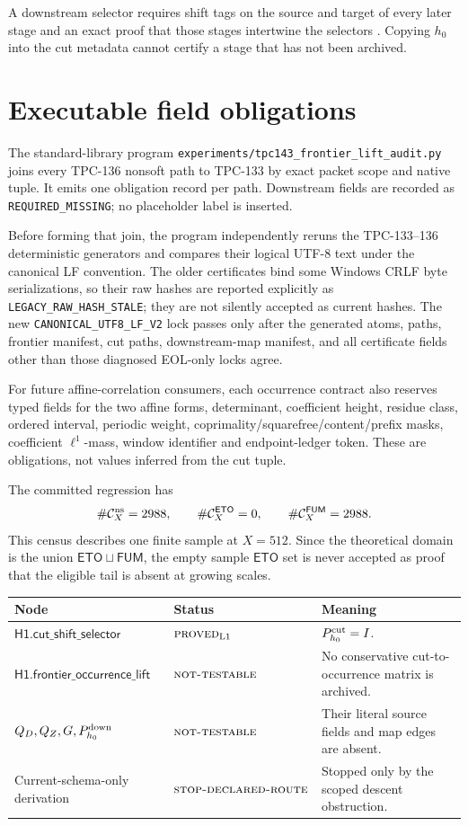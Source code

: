 \documentclass[11pt]{article}
\theoremstyle{definition}
\theoremstyle{remark}
\newcommand{\NT}{\textnormal{\textsc{not-testable}}}
\newcommand{\PROVED}{\textnormal{\textsc{proved}}}
\newcommand{\STOP}{\textnormal{\textsc{stop-declared-route}}}
\newcommand{\Lone}{\mathrm{L1}}
\newcommand{\Ccut}{\mathcal C_X^{\rm ns}}
\begin{document}
A downstream selector requires shift tags on the source and target of
every later stage and an exact proof that those stages intertwine the
selectors \citep{WangTPC123,WangTPC125}.  Copying \(h_0\) into the
cut metadata cannot certify a stage that has not been archived.

\section{Executable field obligations}

The standard-library program
\texttt{experiments/tpc143\_frontier\_lift\_audit.py} joins every
TPC-136 nonsoft path to TPC-133 by exact packet scope and native
tuple.  It emits one obligation record per path.  Downstream fields
are recorded as \texttt{REQUIRED\_MISSING}; no placeholder label is
inserted.

Before forming that join, the program independently reruns the
TPC-133--136 deterministic generators and compares their logical UTF-8
text under the canonical LF convention.  The older certificates bind
some Windows CRLF byte serializations, so their raw hashes are
reported explicitly as \texttt{LEGACY\_RAW\_HASH\_STALE}; they are not
silently accepted as current hashes.  The new
\texttt{CANONICAL\_UTF8\_LF\_V2} lock passes only after the generated
atoms, paths, frontier manifest, cut paths, downstream-map manifest,
and all certificate fields other than those diagnosed EOL-only locks
agree.

For future affine-correlation consumers, each occurrence contract
also reserves typed fields for the two affine forms, determinant,
coefficient height, residue class, ordered interval, periodic weight,
coprimality/squarefree/content/prefix masks, coefficient
\(\ell^1\)-mass, window identifier and endpoint-ledger token.  These
are obligations, not values inferred from the cut tuple.

The committed regression has
\[
 \#\Ccut=2988,\qquad
 \#\mathcal C_X^{\mathsf{ETO}}=0,\qquad
 \#\mathcal C_X^{\mathsf{FUM}}=2988.
\]
This census describes one finite sample at \(X=512\).  Since the
theoretical domain is the union \(\mathsf{ETO}\sqcup\mathsf{FUM}\),
the empty sample \(\mathsf{ETO}\) set is never accepted as proof that
the eligible tail is absent at growing scales.

\begin{center}
\small
\begin{tabularx}{\textwidth}{@{}P{0.38\textwidth}P{0.22\textwidth}Y@{}}
\toprule
Node & Status & Meaning\\
\midrule
\(\mathsf{H1.cut\_shift\_selector}\)
& \(\PROVED_{\Lone}\) & \(P_{h_0}^{\rm cut}=I\).\\
\(\mathsf{H1.frontier\_occurrence\_lift}\)
& \(\NT\) & No conservative cut-to-occurrence matrix is archived.\\
\(Q_D,Q_Z,G,P_{h_0}^{\rm down}\)
& \(\NT\) & Their literal source fields and map edges are absent.\\
Current-schema-only derivation
& \(\STOP\) & Stopped only by the scoped descent obstruction.\\
\bottomrule
\end{tabularx}
\end{center}
\end{document}

